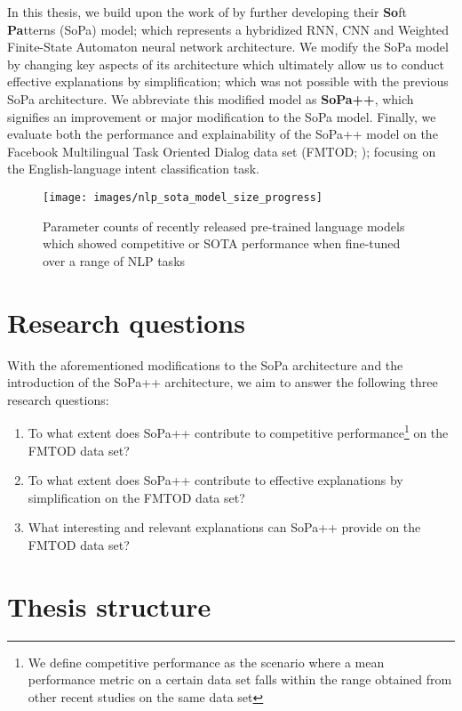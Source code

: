 In this thesis, we build upon the work of \citet{schwartz2018sopa} by further developing their \textbf{So}ft \textbf{Pa}tterns (SoPa) model; which represents a hybridized RNN, CNN and Weighted Finite-State Automaton neural network architecture. We modify the SoPa model by changing key aspects of its architecture which ultimately allow us to conduct effective explanations by simplification; which was not possible with the previous SoPa architecture. We abbreviate this modified model as \textbf{SoPa++}, which signifies an improvement or major modification to the SoPa model. Finally, we evaluate both the performance and explainability of the SoPa++ model on the Facebook Multilingual Task Oriented Dialog data set (FMTOD; \citealt{schuster2018cross}); focusing on the English-language intent classification task.

\begin{figure}[th]
  \centering
  \texttt{[image: images/nlp\_sota\_model\_size\_progress]}
  \caption{Parameter counts of recently released pre-trained language models which showed competitive or SOTA performance when fine-tuned over a range of NLP tasks \citep{sanh2019distilbert}}
  \label{fig:nlp_progress}
\end{figure}

\section{Research questions}

With the aforementioned modifications to the SoPa architecture and the introduction of the SoPa++ architecture, we aim to answer the following three research questions:

\begin{enumerate}
  \item To what extent does SoPa++ contribute to competitive performance\footnote{We define competitive performance as the scenario where a mean performance metric on a certain data set falls within the range obtained from other recent studies on the same data set} on the FMTOD data set?
  \item To what extent does SoPa++ contribute to effective explanations by simplification on the FMTOD data set?
  \item What interesting and relevant explanations can SoPa++ provide on the FMTOD data set?
\end{enumerate}

\section{Thesis structure}

